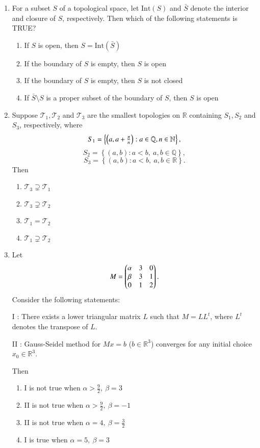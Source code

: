 \documentclass[journal,12pt,onecolumn]{IEEEtran}
\theoremstyle{remark}
\begin{document}
\begin{enumerate}[start=1, label=Q.\arabic*]
\hfill{}


\item For a subset $S$ of a topological space, let $\text{Int}(S)$ and $\bar{S}$ denote the interior and closure of $S$, respectively. Then which of the following statements is TRUE?  
\begin{enumerate}
\item If $S$ is open, then $S=\text{Int}(\bar{S})$
\item If the boundary of $S$ is empty, then $S$ is open
\item If the boundary of $S$ is empty, then $S$ is not closed
\item If $\bar{S}\setminus S$ is a proper subset of the boundary of $S$, then $S$ is open
\end{enumerate}

\hfill{}

\item Suppose $\mathscr{T}_1, \mathscr{T}_2$ and $\mathscr{T}_3$ are the smallest topologies on $\mathbb{R}$ containing $S_1, S_2$ and $S_3$, respectively, where
\[
S_1 = \left\{ \left(a, a + \tfrac{\pi}{n}\right) : a \in \mathbb{Q}, n \in \mathbb{N} \right\},
\]
\[
S_2 = \left\{ (a,b) : a < b, \ a,b \in \mathbb{Q} \right\},
\]
\[
S_3 = \left\{ (a,b) : a < b, \ a,b \in \mathbb{R} \right\}.
\]
Then
\begin{enumerate}
\item $\mathscr{T}_3 \supsetneq \mathscr{T}_1$
\item $\mathscr{T}_3 \supsetneq \mathscr{T}_2$
\item $\mathscr{T}_1 = \mathscr{T}_2$
\item $\mathscr{T}_1 \supsetneq \mathscr{T}_2$
\end{enumerate}

\hfill{}


\item Let 
\[
M = \begin{pmatrix}\alpha & 3 & 0 \\ \beta & 3 & 1 \\ 0 & 1 & 2\end{pmatrix}.
\]
Consider the following statements:  

I : There exists a lower triangular matrix $L$ such that $M = LL^t$, where $L^t$ denotes the transpose of $L$.  

II : Gauss-Seidel method for $Mx=b$ ($b \in \mathbb{R}^3$) converges for any initial choice $x_0 \in \mathbb{R}^3$.  

Then
\begin{enumerate}
\item I is not true when $\alpha > \tfrac{9}{2}, \ \beta = 3$
\item II is not true when $\alpha > \tfrac{9}{2}, \ \beta = -1$
\item II is not true when $\alpha = 4, \ \beta = \tfrac{3}{2}$
\item I is true when $\alpha = 5, \ \beta = 3$
\end{enumerate}


\end{enumerate}
\end{document}

